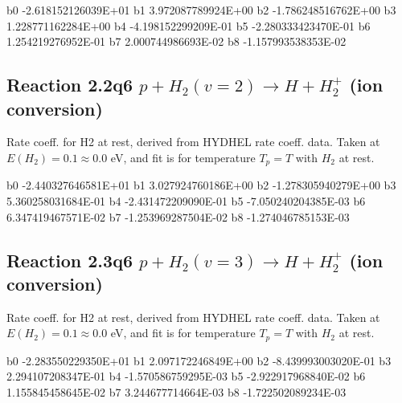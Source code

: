 \documentclass[12pt,dvipdfmx]{article}
\begin{document}
\begin{{small}}\begin{{verbatim}}

  b0 -2.618152126039E+01  b1  3.972087789924E+00  b2 -1.786248516762E+00
  b3  1.228771162284E+00  b4 -4.198152299209E-01  b5 -2.280333423470E-01
  b6  1.254219276952E-01  b7  2.000744986693E-02  b8 -1.157993538353E-02

\end{{verbatim}}\end{{small}}

\newpage
\subsection{
Reaction 2.2q6
$ p + H_2(v=2) \rightarrow H + H_2^+$ (ion conversion)
}
Rate coeff. for H2 at rest, derived from HYDHEL rate coeff. data.
Taken at $E(H_2) = 0.1 \approx 0.0$ eV,  and fit is for temperature $T_p=T$ with $H_2$ at rest.

\begin{{small}}\begin{{verbatim}}

  b0 -2.440327646581E+01  b1  3.027924760186E+00  b2 -1.278305940279E+00
  b3  5.360258031684E-01  b4 -2.431472209090E-01  b5 -7.050240204385E-03
  b6  6.347419467571E-02  b7 -1.253969287504E-02  b8 -1.274046785153E-03

\end{{verbatim}}\end{{small}}

\newpage
\subsection{
Reaction 2.3q6
$ p + H_2(v=3) \rightarrow H + H_2^+$ (ion conversion)
}
Rate coeff. for H2 at rest, derived from HYDHEL rate coeff. data.
Taken at $E(H_2) = 0.1 \approx 0.0$ eV,  and fit is for temperature $T_p=T$ with $H_2$ at rest.

\begin{{small}}\begin{{verbatim}}

  b0 -2.283550229350E+01  b1  2.097172246849E+00  b2 -8.439993003020E-01
  b3  2.294107208347E-01  b4 -1.570586759295E-03  b5 -2.922917968840E-02
  b6  1.155845458645E-02  b7  3.244677714664E-03  b8 -1.722502089234E-03

\end{{verbatim}}\end{{small}}
\end{document}
